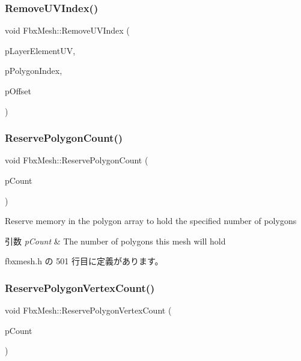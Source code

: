 \subsubsection{\texorpdfstring{Remove\+U\+V\+Index()}{RemoveUVIndex()}}
{\footnotesize\ttfamily void Fbx\+Mesh\+::\+Remove\+U\+V\+Index (\begin{DoxyParamCaption}\item[{\hyperlink{class_fbx_layer_element_u_v}{Fbx\+Layer\+Element\+UV} $\ast$}]{p\+Layer\+Element\+UV,  }\item[{int}]{p\+Polygon\+Index,  }\item[{int}]{p\+Offset }\end{DoxyParamCaption})\hspace{0.3cm}{\ttfamily [protected]}}

\mbox{\label{class_fbx_mesh_ab7d47000aac6c7de0a6fe0ccaff248cd}} 
\subsubsection{\texorpdfstring{Reserve\+Polygon\+Count()}{ReservePolygonCount()}}
{\footnotesize\ttfamily void Fbx\+Mesh\+::\+Reserve\+Polygon\+Count (\begin{DoxyParamCaption}\item[{int}]{p\+Count }\end{DoxyParamCaption})\hspace{0.3cm}{\ttfamily [inline]}}

Reserve memory in the polygon array to hold the specified number of polygons 
\begin{DoxyParams}{引数}
{\em p\+Count} & The number of polygons this mesh will hold \\
\hline
\end{DoxyParams}


 fbxmesh.\+h の 501 行目に定義があります。

\mbox{\label{class_fbx_mesh_a6cb8ace34a7b945a249a73f5293075e4}} 
\subsubsection{\texorpdfstring{Reserve\+Polygon\+Vertex\+Count()}{ReservePolygonVertexCount()}}
{\footnotesize\ttfamily void Fbx\+Mesh\+::\+Reserve\+Polygon\+Vertex\+Count (\begin{DoxyParamCaption}\item[{int}]{p\+Count }\end{DoxyParamCaption})\hspace{0.3cm}{\ttfamily [inline]}}

